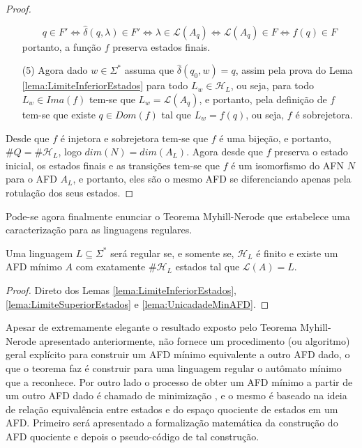 \begin{proof}
\begin{itemize}
		$$q \in F' \Longleftrightarrow \widehat{\delta}(q, \lambda) \in F' \Longleftrightarrow  \lambda \in \mathcal{L}(A_q) \Longleftrightarrow \mathcal{L}(A_q) \in F \Longleftrightarrow f(q) \in F$$
		portanto, a função $f$ preserva estados finais.
		\item[(5)] Agora dado $w \in \Sigma^*$ assuma que $\widehat{\delta}(q_0, w) = q$, assim pela prova do Lema \ref{lema:LimiteInferiorEstados} para todo $L_w \in \mathcal{H}_L$, ou seja, para todo $L_w \in Ima(f)$ tem-se que $L_w = \mathcal{L}(A_q)$, e portanto, pela definição de $f$ tem-se que existe $q \in D	om(f)$ tal que $L_w = f(q)$, ou seja, $f$ é sobrejetora.
	\end{itemize}
	Desde que $f$ é injetora e sobrejetora tem-se que $f$ é uma bijeção, e portanto, $\#Q = \#\mathcal{H}_L$, logo $dim(N) = dim(A_L)$. Agora desde que $f$ preserva o estado inicial, os estados finais e as transições tem-se que $f$ é um isomorfismo do AFN $N$ para o AFD $A_L$, e portanto, eles são o mesmo AFD se diferenciando apenas pela rotulação dos seus estados. 
\end{proof}

Pode-se agora finalmente enunciar o Teorema Myhill-Nerode que estabelece uma caracterização para as linguagens regulares.

\begin{theorem}\label{teo:Myhill-Nerode}
	Uma linguagem $L \subseteq \Sigma^*$ será regular se, e somente se, $\mathcal{H}_L$ é finito e existe um AFD mínimo $A$ com exatamente $\# \mathcal{H}_L$ estados tal que $\mathcal{L}(A) = L$.
\end{theorem}

\begin{proof}
	Direto dos Lemas \ref{lema:LimiteInferiorEstados}, \ref{lema:LimiteSuperiorEstados} e \ref{lema:UnicadadeMinAFD}.
\end{proof}

Apesar de extremamente elegante o resultado exposto pelo Teorema Myhill-Nerode apresentado anteriormente, não fornece um procedimento (ou algoritmo) geral explícito para construir um AFD mínimo equivalente a outro AFD dado, o que o teorema faz é construir para uma linguagem regular o autômato mínimo que a reconhece. Por outro lado o processo de obter um AFD mínimo a partir de um outro AFD dado é chamado de minimização \cite{benjaLivro2010}, e o mesmo é baseado na ideia de relação equivalência entre estados e do espaço quociente de estados em um AFD. Primeiro será apresentado a formalização matemática da construção do AFD quociente e depois o pseudo-código de tal construção.

